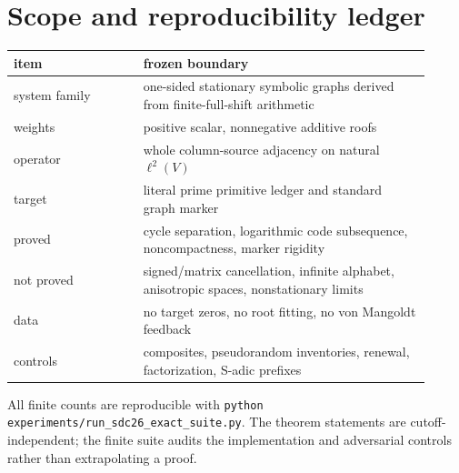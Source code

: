 \section{Scope and reproducibility ledger}

\begin{center}
\small
\begin{tabular}{@{}p{0.29\linewidth}p{0.62\linewidth}@{}}
\toprule
item & frozen boundary\\
\midrule
system family & one-sided stationary symbolic graphs derived from finite-full-shift arithmetic\\
weights & positive scalar, nonnegative additive roofs\\
operator & whole column-source adjacency on natural $\ell^2(V)$\\
target & literal prime primitive ledger and standard graph marker\\
proved & cycle separation, logarithmic code subsequence, noncompactness, marker rigidity\\
not proved & signed/matrix cancellation, infinite alphabet, anisotropic spaces, nonstationary limits\\
data & no target zeros, no root fitting, no von Mangoldt feedback\\
controls & composites, pseudorandom inventories, renewal, factorization, S-adic prefixes\\
\bottomrule
\end{tabular}
\end{center}

All finite counts are reproducible with
\texttt{python experiments/run\_sdc26\_exact\_suite.py}.
The theorem statements are cutoff-independent; the finite suite audits the
implementation and adversarial controls rather than extrapolating a proof.
